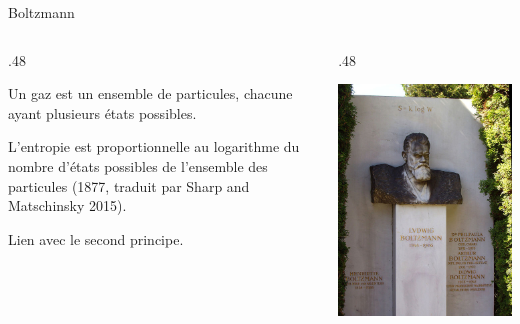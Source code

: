 \documentclass[ignorenonframetext,]{beamer}
\def\begincols{\begin{columns}}
\def\begincol{\begin{column}}
\def\endcol{\end{column}}
\def\endcols{\end{columns}}
\begin{document}
\begin{frame}{Boltzmann}

\begincols
 \begincol{.48\textwidth}

Un gaz est un ensemble de particules, chacune ayant plusieurs états
possibles.

L'entropie est proportionnelle au logarithme du nombre d'états possibles
de l'ensemble des particules (1877, traduit par Sharp and Matschinsky
2015).

Lien avec le second principe.

\endcol
 \begincol{.48\textwidth}

\includegraphics{Images/520px-Zentralfriedhof_Vienna_-_Boltzmann.jpg}

\endcol
\endcols

\end{frame}
\end{document}
